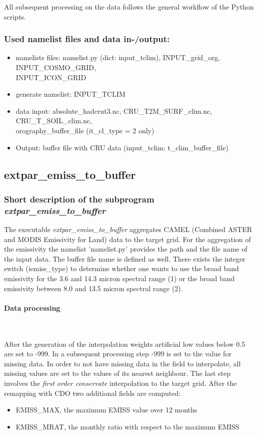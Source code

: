 \documentclass[a4paper,10pt,DIV14,BCOR1cm,titlepage,twoside]{scrartcl}
\begin{document}
\noindent All subsequent processing on the data follows the general workflow of the Python scripts.

\subsubsection{Used namelist files and data in-/output:}
\begin{itemize}
 \item namelists files: namelist.py (dict: input\_tclim), INPUT\_grid\_org, INPUT\_COSMO\_GRID, \\
       INPUT\_ICON\_GRID
 \item generate namelist: INPUT\_TCLIM
 \item data input: absolute\_hadcrut3.nc, CRU\_T2M\_SURF\_clim.nc, CRU\_T\_SOIL\_clim.nc, \\
       orography\_buffer\_file (it\_cl\_type = 2 only)
 \item Output: buffer file with CRU data (input\_tclim: t\_clim\_buffer\_file)
\end{itemize}

\subsection{extpar\_emiss\_to\_buffer}\label{extpar_emiss_to_buffer}
\subsubsection{Short description of the subprogram \textit{extpar\_emiss\_to\_buffer}}
The executable \textit{extpar\_emiss\_to\_buffer} aggregates CAMEL (Combined ASTER and MODIS Emissivity for Land) data  to the target grid.
For the aggregation of the emissivity the namelist 'namelist.py' provides the path and the file name of the input data. The buffer file name is defined as well. There exists the integer switch (iemiss\_type)
to determine whether one wants to use the broad band emissivity for the 3.6 and 14.3 micron spectral range
(1) or the broad band emissivity between 8.0 and 13.5 micron spectral range (2).

\paragraph{Data processing} \ \par\medskip\noindent
After the generation of the interpolation weights artificial low values below 0.5 are set to -999. In a subsequent processing step -999 is set to the value for missing data.
In order to not have missing data in the field to interpolate, all missing values are set to the values of its nearest neighbour.
The last step involves the \textit{first order conservate} interpolation to the target grid. After the remapping with CDO two additional fields are computed:
\begin{itemize}
  \item EMISS\_MAX, the maximum EMISS value over 12 months
  \item EMISS\_MRAT, the monthly ratio with respect to the maximum EMISS
\end{itemize}
\end{document}

